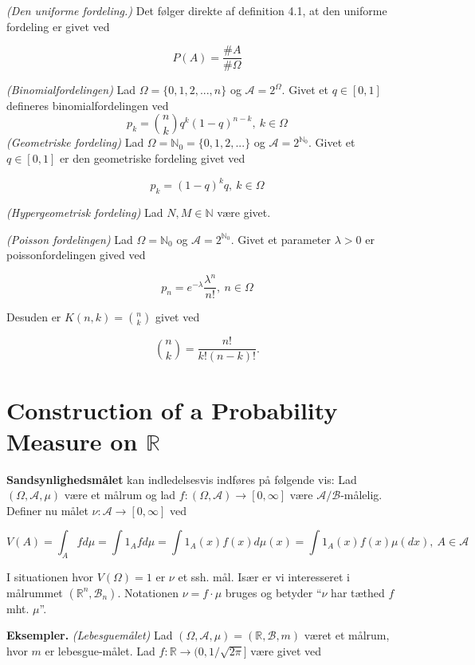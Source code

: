 \documentclass[
]{book}
\begin{document}
\emph{(Den uniforme fordeling.)} Det følger direkte af definition 4.1, at den uniforme fordeling er givet ved

\[
P(A)=\frac{\#A}{\#\Omega}
\]

\emph{(Binomialfordelingen)} Lad \(\Omega=\{0,1,2,...,n\}\) og \(\mathcal{A}=2^\Omega\). Givet et \(q\in[0,1]\) defineres binomialfordelingen ved
\[
p_k={n\choose k}q^k(1-q)^{n-k},\ k\in\Omega
\]
\emph{(Geometriske fordeling)} Lad \(\Omega=\mathbb{N}_0=\{0,1,2,...\}\) og \(\mathcal{A}=2^{\mathbb{N}_0}\). Givet et \(q\in[0,1]\) er den geometriske fordeling givet ved

\[
p_k=(1-q)^kq,\ k\in\Omega
\]

\emph{(Hypergeometrisk fordeling)} Lad \(N,M\in\mathbb{N}\) være givet.

\emph{(Poisson fordelingen)} Lad \(\Omega=\mathbb{N}_0\) og \(\mathcal{A}=2^{\mathbb{N}_0}\). Givet et parameter \(\lambda>0\) er poissonfordelingen gived ved

\[
p_n=e^{-\lambda}\frac{\lambda^n}{n!},\ n\in\Omega
\]

Desuden er \(K(n,k)={n\choose k}\) givet ved

\[
{n\choose k}=\frac{n!}{k!(n-k)!}.
\]

\hypertarget{construction-of-a-probability-measure-on-mathbb-r}{%
\section{\texorpdfstring{Construction of a Probability Measure on \(\mathbb R\)}{Construction of a Probability Measure on \textbackslash mathbb R}}\label{construction-of-a-probability-measure-on-mathbb-r}}

\textbf{Sandsynlighedsmålet} kan indledelsesvis indføres på følgende vis: Lad \((\Omega, \mathcal{A},\mu)\) være et målrum og lad \(f : (\Omega,\mathcal{A}) \to [0,\infty]\) være \(\mathcal{A}/\mathcal{B}\)-målelig. Definer nu målet \(\nu : \mathcal{A} \to [0,\infty]\) ved

\[
V(A)=\int_A f d\mu=\int 1_A fd\mu=\int 1_A(x)f(x)d\mu(x)=\int1_A(x)f(x)\mu(dx),\ A\in\mathcal{A}
\]

I situationen hvor \(V(\Omega)=1\) er \(\nu\) et ssh. mål. Især er vi interesseret i målrummet \((\mathbb{R}^n,\mathcal{B}_n)\). Notationen \(\nu =f\cdot \mu\) bruges og betyder ``\(\nu\) har tæthed \(f\) mht. \(\mu\)''.

\textbf{Eksempler.} \emph{(Lebesguemålet)} Lad \((\Omega,\mathcal{A},\mu)=(\mathbb{R},\mathcal{B},m)\) været et målrum, hvor \(m\) er lebesgue-målet. Lad \(f : \mathbb{R}\to (0,1/\sqrt{2\pi}]\) være givet ved
\end{document}
